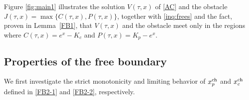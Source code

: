 \documentclass[11pt, a4paper, leqno]{amsart}
\numberwithin{equation}{section}
\theoremstyle{plain}
\newtheorem{lemma}[theorem]{Lemma}
\theoremstyle{definition}
\theoremstyle{remark}
\def\le{\leqslant}
\def\leq{\leqslant}
\def\ge{\geqslant}
\begin{document}
Figure \ref{fig:main1} illustrates the solution $V(\tau, x)$ of \eqref{AC} and the obstacle $J(\tau,x)=\max\{C(\tau, x), P(\tau, x)\}$,
{together with \eqref{inq:frees} and the fact, proven in
Lemma~\ref{FB1}, that $V(\tau,x)$ and the obstacle meet only in the
regions where $C(\tau, x) = e^x - K_c$ and $P(\tau, x) = K_p - e^x$.}

\subsection{Properties of the free boundary}
{
We first investigate the strict monotonicity and limiting behavior of
$x_p^{\rm ch}$ and $x_c^{\rm ch}$ defined in
\eqref{FB2-1} and \eqref{FB2-2}, respectively.
}


\end{document}
